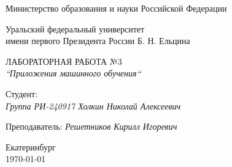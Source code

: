 \thispagestyle{empty}

\begin{center}
	Министерство образования и науки Российской Федерации
	
	\vspace{20pt}
	
	Уральский федеральный университет \\
	имени первого Президента России Б. Н. Ельцина
	
	\vspace{20pt}

\end{center}

\vfill

\begin{center}
	ЛАБОРАТОРНАЯ РАБОТА №3	 \\
	\textit{``Приложения машинного обучения``}
	
	\vspace{20pt}
\end{center}

\vfill

	\noindent Студент: \\
	\textit{Группа РИ-240917 \hfill Холкин Николай Алексеевич}
	
	\vspace{5pt}
	
	\noindent Преподаватель: 
	\textit{\hfill Решетников Кирилл Игоревич}
	
	\vspace{20pt}

\vfill

\begin{center}
	Екатеринбург \\ \today
\end{center}

\newpage